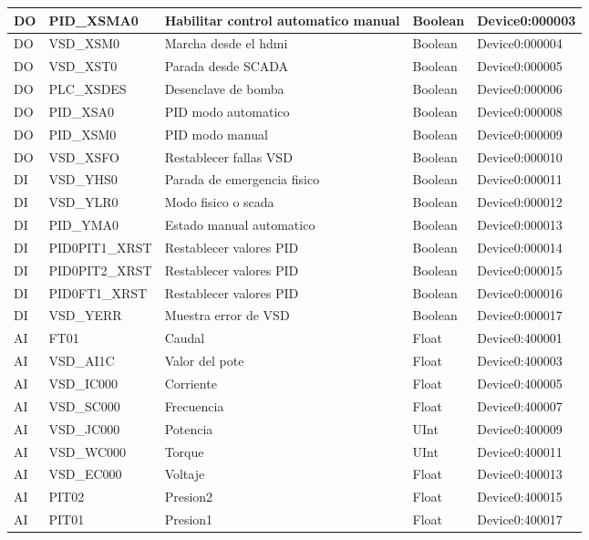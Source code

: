 \begin{longtable}{|p{1.2cm} |p{4cm} |p{4cm} |p{1.5cm} |p{3.2cm} |}
	\endlastfoot
	

	DO & PID\_XSMA0 & Habilitar control automatico manual & Boolean & Device0:000003 \\ \hline
	DO & VSD\_XSM0 & Marcha desde el hdmi & Boolean & Device0:000004 \\ \hline
	DO & VSD\_XST0 & Parada desde SCADA & Boolean & Device0:000005 \\ \hline
	DO & PLC\_XSDES & Desenclave de bomba & Boolean & Device0:000006 \\ \hline
	DO & PID\_XSA0 & PID modo automatico & Boolean & Device0:000008 \\ \hline
	DO & PID\_XSM0 & PID modo manual & Boolean & Device0:000009 \\ \hline
	DO & VSD\_XSFO & Restablecer fallas VSD & Boolean & Device0:000010 \\ \hline
	DI & VSD\_YHS0 & Parada de emergencia fisico & Boolean & Device0:000011 \\ \hline
	DI & VSD\_YLR0 & Modo fisico o scada & Boolean & Device0:000012 \\ \hline
	DI & PID\_YMA0 & Estado manual automatico & Boolean & Device0:000013 \\ \hline
	DI & PID0PIT1\_XRST & Restablecer valores PID & Boolean & Device0:000014 \\ \hline
	DI & PID0PIT2\_XRST & Restablecer valores PID & Boolean & Device0:000015 \\ \hline
	DI & PID0FT1\_XRST & Restablecer valores PID& Boolean & Device0:000016 \\ \hline
	DI & VSD\_YERR & Muestra error de VSD& Boolean & Device0:000017 \\ \hline
	AI & FT01 & Caudal & Float & Device0:400001 \\ \hline
	AI & VSD\_AI1C & Valor del pote & Float & Device0:400003 \\ \hline
	AI & VSD\_IC000 & Corriente & Float & Device0:400005 \\ \hline
	AI & VSD\_SC000 & Frecuencia & Float & Device0:400007 \\ \hline
	AI & VSD\_JC000 & Potencia & UInt & Device0:400009 \\ \hline
	AI & VSD\_WC000 & Torque & UInt & Device0:400011 \\ \hline
	AI & VSD\_EC000 & Voltaje & Float & Device0:400013 \\ \hline
	AI & PIT02 & Presion2 & Float & Device0:400015 \\ \hline
	AI & PIT01 & Presion1 & Float & Device0:400017 \\ \hline

\end{longtable}
